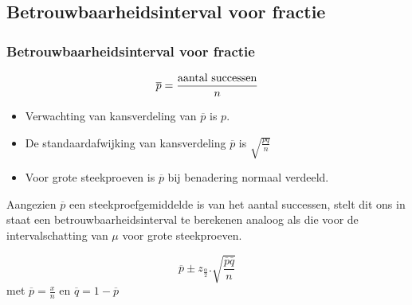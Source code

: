 \documentclass[aspectratio=169]{beamer}
\begin{document}
\subsection{Betrouwbaarheidsinterval voor fractie}
\begin{frame}
  \frametitle{Betrouwbaarheidsinterval voor fractie}
  \[ \overline{p} = \frac{\textnormal{aantal successen}}{n} \]
  \begin{itemize}
    \item Verwachting van kansverdeling van $\overline{p}$ is $p$.
    \item De standaardafwijking van kansverdeling $\overline{p}$ is $\sqrt{\frac{pq}{n}}$
    \item Voor grote steekproeven is $\overline{p}$ bij benadering normaal verdeeld.
  \end{itemize}
  Aangezien $\overline{p}$ een steekproefgemiddelde is van het aantal successen, stelt dit ons in staat een betrouwbaarheidsinterval te berekenen analoog als die voor de intervalschatting van $\mu$ voor grote steekproeven.
  
  
  \[ \overline{p} \pm z_{\frac{\alpha}{2}}.\sqrt{\frac{\overline{p}\overline{q}}{n}} \]
  met $\overline{p} = \frac{x}{n}$ en $\overline{q} = 1- \overline{p}$
  
\end{frame}
\end{document}
